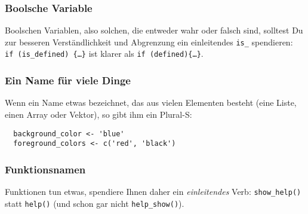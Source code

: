 \documentclass[twoside]{scrartcl}
\providecommand{\code}[1]{\texttt{#1}}
\begin{document}
\subsubsection{Boolsche Variable}
Boolschen Variablen, also solchen, die entweder wahr oder falsch sind, solltest
Du zur besseren Verst\"a{}ndlichkeit und Abgrenzung ein einleitendes \code{is\_}
spendieren: \code{ if~(is\_defined)~\{\ldots\}} ist klarer als
\code{if~(defined)\{\ldots\}}.

\subsubsection{Ein Name f\"u{}r viele Dinge}
Wenn ein Name etwas bezeichnet, das aus vielen Elementen besteht (eine Liste,
einen Array oder Vektor), so gibt ihm ein Plural-S:
\begin{lstlisting}
  background_color <- 'blue'
  foreground_colors <- c('red', 'black')
\end{lstlisting}

\subsubsection{Funktionsnamen}
Funktionen tun etwas, spendiere Ihnen daher ein \emph{einleitendes} Verb:
\code{show\_help()} statt \code{help()} (und schon gar nicht  
\code{help\_show()}).
\end{document}
